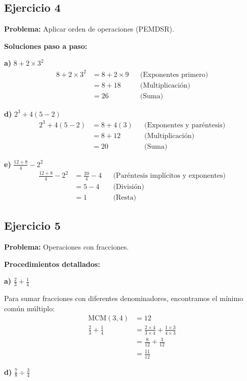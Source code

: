 \subsection*{Ejercicio 4}

\textbf{Problema:} Aplicar orden de operaciones (PEMDSR).

\textbf{Soluciones paso a paso:}

\textbf{a)} $8 + 2 \times 3^2$
\begin{align}
8 + 2 \times 3^2 &= 8 + 2 \times 9 && \text{(Exponentes primero)}\\
&= 8 + 18 && \text{(Multiplicación)}\\
&= 26 && \text{(Suma)}
\end{align}

\textbf{d)} $2^3 + 4(5 - 2)$
\begin{align}
2^3 + 4(5 - 2) &= 8 + 4(3) && \text{(Exponentes y paréntesis)}\\
&= 8 + 12 && \text{(Multiplicación)}\\
&= 20 && \text{(Suma)}
\end{align}

\textbf{e)} $\frac{12 + 8}{4} - 2^2$
\begin{align}
\frac{12 + 8}{4} - 2^2 &= \frac{20}{4} - 4 && \text{(Paréntesis implícitos y exponentes)}\\
&= 5 - 4 && \text{(División)}\\
&= 1 && \text{(Resta)}
\end{align}

\subsection*{Ejercicio 5}

\textbf{Problema:} Operaciones con fracciones.

\textbf{Procedimientos detallados:}

\textbf{a)} $\frac{2}{3} + \frac{1}{4}$

Para sumar fracciones con diferentes denominadores, encontramos el mínimo común múltiplo:
\begin{align}
\text{MCM}(3,4) &= 12\\
\frac{2}{3} + \frac{1}{4} &= \frac{2 \times 4}{3 \times 4} + \frac{1 \times 3}{4 \times 3}\\
&= \frac{8}{12} + \frac{3}{12}\\
&= \frac{11}{12}
\end{align}

\textbf{d)} $\frac{7}{8} \div \frac{3}{4}$

